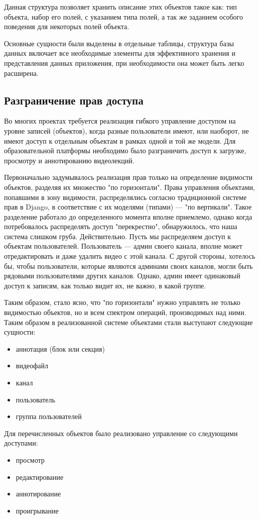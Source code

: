 Данная структура позволяет хранить описание этих объектов такое как: тип объекта,
набор его полей, с указанием типа полей, а так же заданием особого поведения для
некоторых полей объекта.

Основные сущности были выделены в отдельные таблицы, структура базы данных включает
все необходимые элементы для эффективного хранения и представления данных приложения,
при необходимости она может быть легко расширена.

\subsection{Разграничение прав доступа}

Во многих проектах требуется реализация гибкого управление доступом на уровне записей (объектов), когда разные
пользователи имеют, или наоборот, не имеют доступ к отдельным объектам в рамках одной и той же модели. Для образовательной
платформы необходимо было разграничить доступ к загрузке, просмотру и аннотированию видеолекций.

Первоначально задумывалось реализация прав только на определение видимости объектов, разделяя их множество "по горизонтали".
Права управления объектами, попавшими в зону видимости, распределялись согласно традиционной системе прав в Django,
в соответствие с их моделями (типами) — "по вертикали". Такое разделение работало до определенного момента вполне приемлемо,
однако когда потребовалось распределять доступ "перекрестно", обнаружилось, что наша система слишком груба.
Действительно. Пусть мы распределяем доступ к объектам пользователей. Пользователь — админ своего канала, вполне может
отредактировать и даже удалить видео с этой канала. С другой стороны, хотелось бы, чтобы пользователи, которые являются
админами своих каналов, могли быть рядовыми пользователями других каналов. Однако, админ имеет одинаковый доступ к записям,
как только видит их, не важно, в какой группе.

Таким образом, стало ясно, что "по горизонтали" нужно управлять не только видимостью объектов, но и всем спектром операций,
производимых над ними. Таким образом в реализованной системе объектами стали выступают следующие сущности:
\begin{itemize}[wide,topsep=0pt]
  \itemsep0em
  \item аннотация (блок или секция)
  \item видеофайл
  \item канал
  \item пользователь
  \item группа пользователей
\end{itemize}
Для перечисленных объектов было реализовано управление со следующими доступами:
\begin{itemize}[wide,topsep=0pt]
  \itemsep0em
  \item просмотр
  \item редактирование
  \item аннотирование
  \item проигрывание
\end{itemize}

